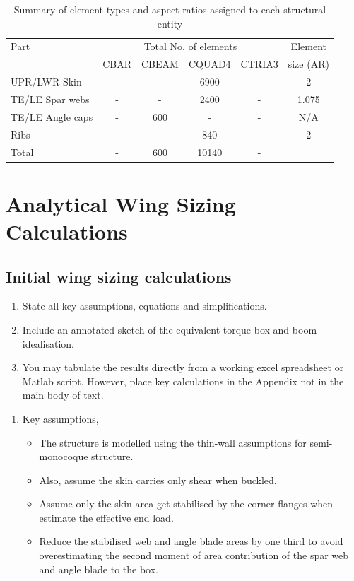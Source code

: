 \documentclass[11pt,a4paper,oneside]{memoir}
\begin{document}
\begin{table}[h]
\centering
\vspace{-2cm}
\caption{Summary of element types and aspect ratios assigned to each structural entity}
\label{tab:summary-mesh}	
\begin{tabular}{lccccc}
\toprule
Part               & \multicolumn{4}{c}{Total No. of elements}   & Element      \\
\cmidrule{2-5}     &  CBAR & CBEAM  & CQUAD4  & CTRIA3           &   size (AR)  \\
\midrule
UPR/LWR Skin       &   -    &  -      & 6900        &  -                &       2       \\
TE/LE Spar webs    &    -   &   -     &  2400       &     -             &        1.075      \\
TE/LE Angle caps   &  -     &   600     &    -     &    -              &        N/A      \\
Ribs               &   -    &     -   &  840       &        -          &           2   \\
\midrule
Total              &    -   &    600    &     10140    &       -           &              \\
\bottomrule
\end{tabular}
\end{table}

\chapter{Analytical Wing Sizing Calculations}\label{chap:hand-calcs}
\section{Initial wing sizing calculations}
\begin{enumerate}
	\item State all key assumptions, equations and simplifications. 
	\item Include an annotated sketch of the equivalent torque box and boom idealisation.
	\item You may tabulate the results directly from a working excel spreadsheet or Matlab script. However, place key calculations in the Appendix not in the main body of text. 
\end{enumerate}

\begin{enumerate}
    \item Key assumptions,
    \begin{itemize}
        \item The structure is modelled using the thin-wall assumptions for semi-monocoque structure.
        \item Also, assume the skin carries only shear when buckled.
        \item  Assume only the skin area get stabilised by the corner flanges when estimate the effective end load.
        \item Reduce the stabilised web and angle blade areas by one third to avoid overestimating the second moment of area contribution of the spar web and angle blade to the box.
    \end{itemize}
\end{enumerate}
\end{document}

